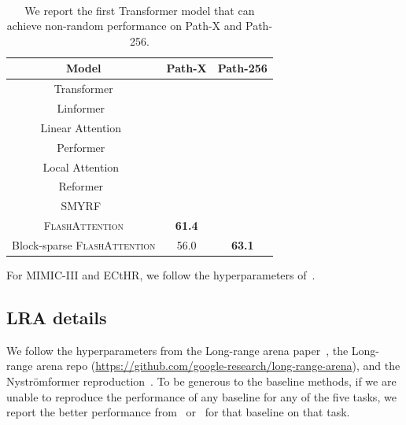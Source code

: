\documentclass{article}
\newcommand{\xmark}{\ding{55}}
\newcommand{\sysname}{\textsc{FlashAttention}\xspace}
\begin{document}
{\begin{table}[h]
\begin{minipage}{2.5in}
    \end{minipage}
    \begin{minipage}{0.20in}
    ~
    \end{minipage}
    \begin{minipage}{2.5in}
\captionsetup{font=small}
    \caption{We report the first Transformer model that can achieve non-random performance on Path-X and Path-256.}
	\centering
	\small
  \resizebox{0.95\linewidth}{!}
  {
	\begin{tabular}{c|cc}
    {\bf Model}  & Path-X & Path-256 \\
	\hline
	Transformer& \xmark & \xmark \\
	Linformer~\citep{wang2020linformer}& \xmark & \xmark \\
	Linear Attention~\citep{katharopoulos2020transformers}& \xmark & \xmark \\
	Performer~\citep{choromanski2020rethinking}& \xmark & \xmark \\
	Local Attention~\citep{tay2020long} & \xmark & \xmark \\
	Reformer~\citep{kitaev2020reformer}& \xmark & \xmark \\
	SMYRF~\citep{daras2020smyrf}& \xmark & \xmark \\
	
    \hline
    \sysname & \textbf{61.4} & \xmark \\
    Block-sparse \sysname & 56.0 & \textbf{63.1} \\
	
	\end{tabular}
  }
	\label{table:pathx}

    \end{minipage}
\end{table}
\vspace{-1em}
}{}

For MIMIC-III and ECtHR, we follow the hyperparameters of~\citet{dai2022revisiting}.

\subsection{LRA details}
\label{subsec:lra_details}

We follow the hyperparameters from the Long-range arena
paper~\citep{tay2020long}, the Long-range arena repo
(\url{https://github.com/google-research/long-range-arena}), and the
Nystr{\"o}mformer reproduction~\citep{xiong2021nystromformer}.
To be generous to the baseline methods, if we are unable to reproduce the
performance of any baseline for any of the five tasks, we report the better
performance from~\citet{tay2020long} or~\citet{xiong2021nystromformer} for that
baseline on that task.
\end{document}
